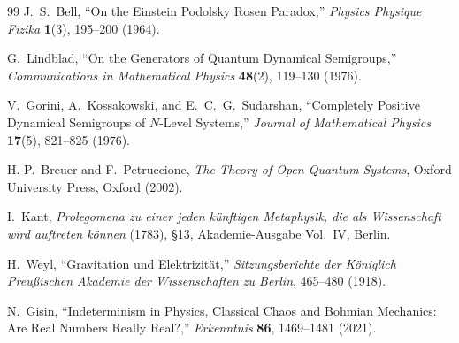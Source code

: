 \documentclass[11pt,a4paper]{article}
\begin{document}
\begin{thebibliography}{99}
J.~S.~Bell, ``On the Einstein Podolsky Rosen Paradox,'' \emph{Physics Physique Fizika} \textbf{1}(3), 195--200 (1964).

G.~Lindblad, ``On the Generators of Quantum Dynamical Semigroups,'' \emph{Communications in Mathematical Physics} \textbf{48}(2), 119--130 (1976).

V.~Gorini, A.~Kossakowski, and E.~C.~G.~Sudarshan, ``Completely Positive Dynamical Semigroups of $N$-Level Systems,'' \emph{Journal of Mathematical Physics} \textbf{17}(5), 821--825 (1976).

H.-P.~Breuer and F.~Petruccione, \emph{The Theory of Open Quantum Systems}, Oxford University Press, Oxford (2002).

I.~Kant, \emph{Prolegomena zu einer jeden künftigen Metaphysik, die als Wissenschaft wird auftreten können} (1783), §13, Akademie-Ausgabe Vol.~IV, Berlin.

H.~Weyl, ``Gravitation und Elektrizität,'' \emph{Sitzungsberichte der Königlich Preußischen Akademie der Wissenschaften zu Berlin}, 465--480 (1918).

N.~Gisin, ``Indeterminism in Physics, Classical Chaos and Bohmian Mechanics: Are Real Numbers Really Real?,'' \emph{Erkenntnis} \textbf{86}, 1469--1481 (2021).

\end{thebibliography}
\end{document}
